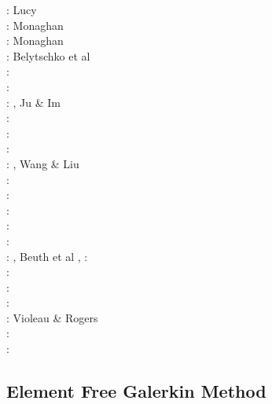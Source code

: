 \begin{scriptsize}
\nineteenseventyseven: Lucy \cite{lucy77}\\
\nineteeneightyfive: Monaghan \cite{mona85}\\
\nineteenninetytwo: Monaghan \cite{mona92}\\
\nineteenninetysix: Belytschko et al \cite{beko96}\\
\nineteenninetyseven: \cite{mofz97}\\
\nineteenninetynine: \cite{zhfm99}\\
\twothousand: \cite{begl00}\cite{lihl00}, Ju \& Im \cite{juim00}\\
\twothousandone: \cite{idso01}\\
\twothousandtwo: \cite{lilr02}\cite{lill02}\cite{lili02}\\
\twothousandthree: \cite{lill03}\cite{mamo03}\\
\twothousandfour: \cite{hufl04}, Wang \& Liu \cite{wali04}\\
\twothousandfive: \cite{febh05}\cite{lixl05}\cite{thes05}\cite{thje05a}\cite{thje05b}\\
\twothousandsix: \cite{lili06}\cite{yabm06}\\
\twothousandseven: \cite{busf07}\\
\twothousandeight: \cite{bufs08}\cite{lemx08}\\
\twothousandten: \cite{dacl10}\\
\twothousandeleven: \cite{prcl11}\cite{kukg11}\cite{kadm11}\cite{szpt11}\cite{howt11}, Beuth et al \cite{bewv11},
\twothousandtwelve: \cite{szpm12}\\
\twothousandthirteen: \cite{koau13}\cite{viau13}\\
\twothousandfourteen: \cite{dazs14}\cite{lekb14}\\
\twothousandfifteen: \cite{nifs15}\\
\twothousandsixteen: Violeau \& Rogers \cite{viro16}\\
\twothousandeighteen: \cite{krrk18}\cite{goej18}\\
\twothousandnineteen: \cite{meho19}\cite{meho19b}
\end{scriptsize}

\subsection{Element Free Galerkin Method}

